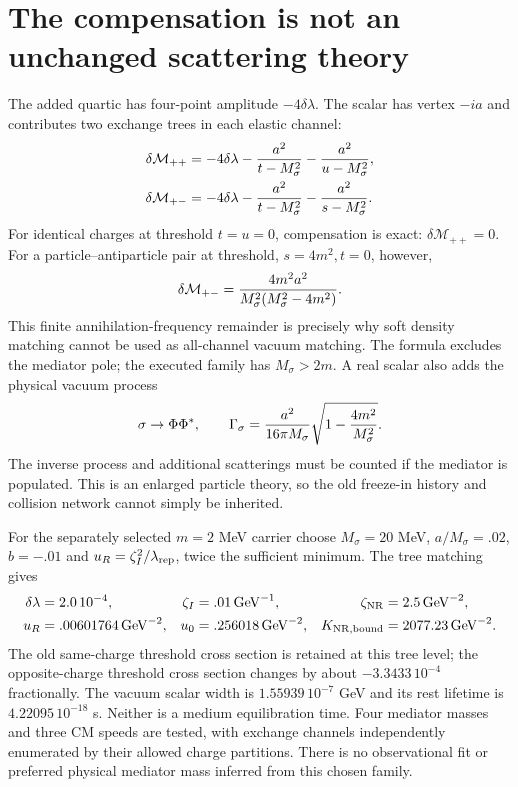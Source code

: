 \documentclass[11pt]{article}
\begin{document}
\section{The compensation is not an unchanged scattering theory}
The added quartic has four-point amplitude $-4\delta\lambda$. The scalar
has vertex $-ia$ and contributes two exchange trees in each elastic channel:
\begin{align}
 \delta\mathcal M_{++}&=-4\delta\lambda
       -{a^2\over t-M_\sigma^2}-{a^2\over u-M_\sigma^2},\\
 \delta\mathcal M_{+-}&=-4\delta\lambda
       -{a^2\over t-M_\sigma^2}-{a^2\over s-M_\sigma^2}.
\end{align}
For identical charges at threshold $t=u=0$, compensation is exact:
$\delta\mathcal M_{++}=0$. For a particle--antiparticle pair at threshold,
$s=4m^2,t=0$, however,
\begin{equation}
 \delta\mathcal M_{+-}={4m^2a^2\over
             M_\sigma^2(M_\sigma^2-4m^2)}.
 \label{ns:opposite}
\end{equation}
This finite annihilation-frequency remainder is precisely why soft density
matching cannot be used as all-channel vacuum matching. The formula excludes
the mediator pole; the executed family has $M_\sigma>2m$. A real scalar
also adds the physical vacuum process
\begin{equation}
 \sigma\to\Phi\Phi^*,\qquad
 \Gamma_\sigma={a^2\over16\pi M_\sigma}
                 \sqrt{1-{4m^2\over M_\sigma^2}}.
\end{equation}
The inverse process and additional scatterings must be counted if the
mediator is populated. This is an enlarged particle theory, so the old
freeze-in history and collision network cannot simply be inherited.

For the separately selected $m=2$ MeV carrier choose
$M_\sigma=20$ MeV, $a/M_\sigma=.02$, $b=-.01$ and
$u_R=\zeta_I^2/\lambda_{\rm rep}$, twice the sufficient minimum.
The tree matching gives
\begin{align}
 \delta\lambda&=2.0\,10^{-4},&
 \zeta_I&=.01\,\mathrm{GeV}^{-1},&
 \zeta_{\rm NR}&=2.5\,\mathrm{GeV}^{-2},\\
 u_R&=.00601764\,\mathrm{GeV}^{-2},&
 u_0&=.256018\,\mathrm{GeV}^{-2},&
 K_{\rm NR,bound}&=2077.23\,\mathrm{GeV}^{-2}.
\end{align}
The old same-charge threshold cross section is retained at this tree level;
the opposite-charge threshold cross section changes by about
$-3.3433\,10^{-4}$ fractionally. The vacuum scalar width is
$1.55939\,10^{-7}$ GeV and its rest lifetime is $4.22095\,10^{-18}$ s.
Neither is a medium equilibration time. Four mediator masses and three
CM speeds are tested, with exchange channels independently enumerated by
their allowed charge partitions. There is no observational fit or preferred
physical mediator mass inferred from this chosen family.
\end{document}
